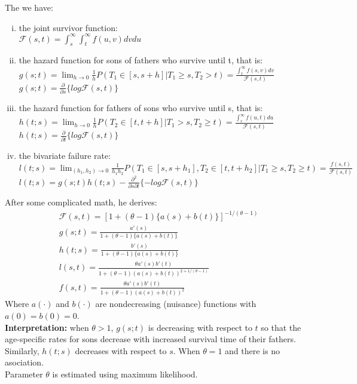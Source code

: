 \documentclass[]{article}
\begin{document}
The we have:
\begin{enumerate}[(i)]
	\item the joint survivor function:\\$\mathcal{F}(s, t) = \int_s^{\infty}\int_t^{\infty} f(u, v)dvdu$
	\item the hazard function for sons of fathers who survive until t, that is:\\
	$g(s;t)=\lim_{h\rightarrow 0} \frac{1}{h} P(T_1\in[s,s+h] | T_1\geq s, T_2 > t) =\frac{ \int_t^{\infty} f(s, v)dv} {\mathcal{F}(s, t)}$\\
	$g(s;t)=\frac{\partial}{\partial s}\{log\mathcal{F}(s,t)\}$
  
	\item the hazard function for fathers of sons who survive until s, that is:\\
	$h(t;s)=\lim_{h\rightarrow 0} \frac{1}{h} P(T_2\in[t,t+h] | T_1 > s, T_2 \geq t) = \frac{ \int_s^{\infty} f(u, t)du} {\mathcal{F}(s, t)}$\\
	$h(t;s)=\frac{\partial}{\partial t}\{log\mathcal{F}(s,t)\}$
  
	\item the bivariate failure rate:\\
	$l(t;s) =\lim_{(h_1,h_2)\rightarrow 0} \frac{1}{h_1 h_2} P(T_1\in[s,s+h_1], T_2\in[t,t+h_2] | T_1\geq s, T_2 \geq t) = \frac{f(s,t)}{\mathcal{F}(s,t)} $\\
  $l(t;s) = g(s;t) h(t;s) - \frac{ \partial^2 }{\partial s \partial t} \{-log\mathcal{F}(s,t)\}$
\end{enumerate}
After some complicated math, he derives:
	$$
	\begin{aligned}
		&\mathcal{F}(s,t) = [1 + (\theta - 1)\{a(s) + b(t)\}]^{-1/(\theta - 1)}\\
		&g(s;t) = \frac{a'(s)}{1 + (\theta - 1)\{a(s) + b(t)\}}\\
		&h(t;s) = \frac{b'(s)}{1 + (\theta - 1)\{a(s) + b(t)\}}\\
		&l(s,t) = \frac{\theta a'(s)b'(t)}{1+(\theta-1)(a(s) + b(t))^{2+1/(\theta-1)}}\\
		&f(s,t) = \frac{\theta a'(s)b'(t)}{1+(\theta-1)(a(s) + b(t))^{2}}
	\end{aligned}
	$$
Where $a(\cdot)$ and $b(\cdot)$ are nondecreasing (nuisance) functions with $a(0) = b(0)=0$.\\
\textbf{Interpretation:} when $\theta>1$, $g(s;t)$ is decreasing with respect to $t$ so that the age-specific rates for sons decrease with increased survival time of their fathers. Similarly, $h(t;s)$ decreases with respect to $s$. When $\theta=1$ and there is no asociation.\\
Parameter $\theta$ is estimated using maximum likelihood.
\end{document}
